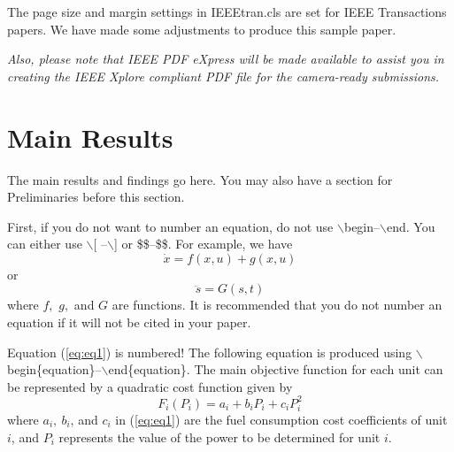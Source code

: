 The page size and margin settings in IEEEtran.cls are set for 
IEEE Transactions papers. We have made some adjustments to 
produce this sample paper.

{\it Also, please note that IEEE PDF eXpress will be made available to assist you in 
creating the IEEE Xplore compliant PDF file for the camera-ready submissions.}

%

\section{Main Results}
The main results and findings go here. You may also have a section for 
Preliminaries before this section.

First, if you do not want to number an equation, do not use
$\backslash$begin--$\backslash$end.
You can either use $\backslash$[ --$\backslash$] or
\$\$--\$\$. For example, we have
$$\dot x= f( x,u) + g (x,u)$$
or 
\[\ddot s=G(s,t)\]
where $f,$ $g,$ and $G$ are functions. It is recommended that you do not 
number an equation if it will not be cited in your paper.

Equation (\ref{eq:eq1}) is numbered!
The following equation is produced 
using $\backslash$begin\{equation\}--$\backslash$end\{equation\}.
The main objective function for each unit can be represented by a 
quadratic cost function given by
\begin{equation}
F_i(P_i)=a_{i}+b_{i}P_i+c_{i}P_{i}^2
\label{eq:eq1}
\end{equation}
where  $a_{i},\ b_{i}$, and $c_{i}$ in (\ref{eq:eq1}) are the fuel consumption cost coefficients 
of unit $i$, and $P_i$ represents the value of the power to be 
determined for unit $i$.

